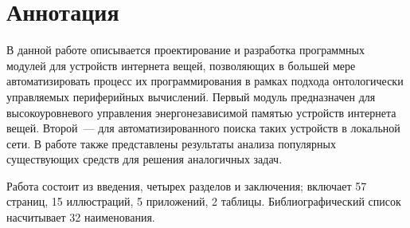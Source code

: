 \hidefromtoc
\chapter*{Аннотация}
\unhidefromtoc

В данной работе описывается проектирование и разработка программных модулей для устройств интернета вещей, позволяющих в большей мере автоматизировать процесс их программирования в рамках подхода онтологически управляемых периферийных вычислений.
Первый модуль предназначен для высокоуровневого управления энергонезависимой памятью устройств интернета вещей.
Второй~--- для автоматизированного поиска таких устройств в локальной сети.
В работе также представлены результаты анализа популярных существующих средств для решения аналогичных задач.

Работа состоит из введения, четырех разделов и заключения; включает 57 страниц, 15 иллюстраций, 5 приложений, 2 таблицы. Библиографический список насчитывает 32 наименования.